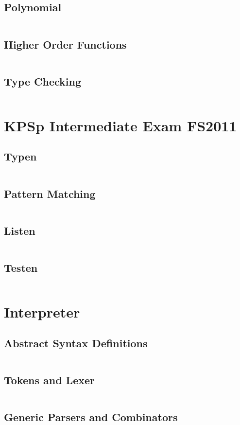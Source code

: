 \documentclass[a4paper,9pt,twoside]{book}
\newcommand{\hsfile}[1]{\inputminted[breaklines]{haskell}{../haskell/#1.hs}}
\begin{document}
\section{Polynomial}
\hsfile{exam2010/problem_2}
\section{Higher Order Functions}
\hsfile{exam2010/problem_3}
\section{Type Checking}
\hsfile{exam2010/problem_4}

\chapter{KPSp Intermediate Exam FS2011}
\section{Typen}
\hsfile{exam2011/problem_1}
\section{Pattern Matching}
\hsfile{exam2011/problem_2}
\section{Listen}
\hsfile{exam2011/problem_3}
\section{Testen}
\hsfile{exam2011/problem_4}

\chapter{Interpreter}
\section{Abstract Syntax Definitions}
\hsfile{interpreter/AbsSyn}
\section{Tokens and Lexer}
\hsfile{interpreter/Scanner}
\section{Generic Parsers and Combinators}
\hsfile{interpreter/ParserCombis2}
\end{document}
